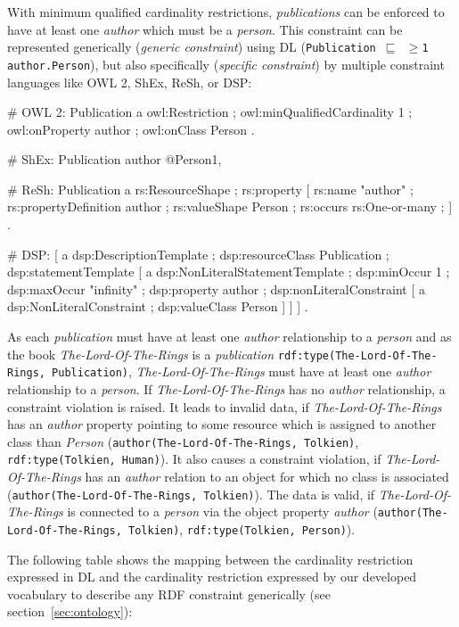 \documentclass{llncs}
\newcommand{\ms}[1]{\texttt{#1}}
\begin{document}
With minimum qualified cardinality restrictions, \emph{publications} can be enforced to have at least one \emph{author} which must be a \emph{person}.
This constraint can be represented generically (\emph{generic constraint}) using DL (\ms{Publication $\sqsubseteq$ $\geq$1 author.Person}), but also specifically (\emph{specific constraint}) by multiple constraint languages like OWL 2, ShEx, ReSh, or DSP:

\begin{ex}
# OWL 2:
Publication
    a owl:Restriction ;
    owl:minQualifiedCardinality 1 ;
    owl:onProperty author ;
    owl:onClass Person .
		
# ShEx:
Publication { author @Person{1, } }

# ReSh:
Publication a rs:ResourceShape ; rs:property [
    rs:name "author" ; rs:propertyDefinition author ;
    rs:valueShape Person ;
    rs:occurs rs:One-or-many ; ] .
		
# DSP:
[   a dsp:DescriptionTemplate ; 
    dsp:resourceClass Publication ; 
    dsp:statementTemplate [ a dsp:NonLiteralStatementTemplate ;
        dsp:minOccur 1 ; dsp:maxOccur "infinity" ; 
        dsp:property author ; 
        dsp:nonLiteralConstraint [ a dsp:NonLiteralConstraint ;
            dsp:valueClass Person ] ] ] .
\end{ex}

As each \emph{publication} must have at least one \emph{author} relationship to a \emph{person} 
and as the book \emph{The-Lord-Of-The-Rings} is a \emph{publication} \ms{rdf:type(The-Lord-Of-The-Rings, Publication)}, 
\emph{The-Lord-Of-The-Rings} must have at least one \emph{author} relationship to a \emph{person}.
If \emph{The-Lord-Of-The-Rings} has no \emph{author} relationship, a constraint violation is raised. 
It leads to invalid data, if \emph{The-Lord-Of-The-Rings} has an \emph{author} property pointing to some resource which is assigned to another class than \emph{Person}
(\ms{author(The-Lord-Of-The-Rings, Tolkien)}, \ms{rdf:type(Tolkien, Human)}).
It also causes a constraint violation, if \emph{The-Lord-Of-The-Rings} has an \emph{author} relation to an object for which no class is associated
(\ms{author(The-Lord-Of-The-Rings, Tolkien)}).
The data is valid, if \emph{The-Lord-Of-The-Rings} is connected to a \emph{person} via the object property \emph{author}
(\ms{author(The-Lord-Of-The-Rings, Tolkien)}, \ms{rdf:type(Tolkien, Person)}).

The following table shows the mapping between the cardinality restriction expressed in DL 
and the cardinality restriction expressed by our developed vocabulary to describe any RDF constraint generically (see section~\ref{sec:ontology}):
\end{document}
